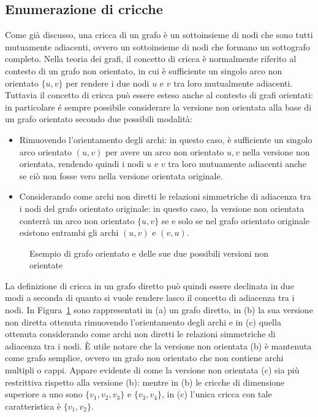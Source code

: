 \subsection{Enumerazione di cricche}\label{sec:enumerazione-di-cricche}

Come gi\`a discusso, una cricca di un grafo \`e un sottoinsieme di nodi che sono tutti mutuamente
adiacenti, ovvero un sottoinsieme di nodi che formano un sottografo completo.
Nella teoria dei grafi, il concetto di cricca \`e normalmente riferito al contesto di un grafo non orientato,
in cui \`e sufficiente un singolo arco non orientato $\{u, v\}$ per rendere i due nodi $u$ e $v$ tra loro
mutualmente adiacenti.
Tuttavia il concetto di cricca pu\`o essere esteso anche al contesto di grafi orientati: in particolare \'e sempre
possibile considerare la versione non orientata alla base di un grafo orientato secondo due possibili modalit\`a:
\begin{itemize}
    \item Rimuovendo l'orientamento degli archi: in questo caso, \`e sufficiente un singolo arco orientato $(u, v)$
        per avere un arco non orientato ${u, v}$ nella versione non orientata, rendendo quindi i nodi $u$ e $v$ tra loro
        mutuamente adiacenti anche se ci\`o non fosse vero nella versione orientata originale.
    \item Considerando come archi non diretti le relazioni simmetriche di adiacenza tra i nodi del grafo orientato
        originale: in questo caso, la versione non orientata conterr\`a un arco non orientato $\{u, v\}$ se e solo se
        nel grafo orientato originale esistono entrambi gli archi $(u, v)$ e $(v, u)$.
\end{itemize}

\begin{figure}[H]
    \centering
    
    \caption{Esempio di grafo orientato e delle sue due possibili versioni non orientate}
    \label{fig:undirected_version_example}
\end{figure}

La definizione di cricca in un grafo diretto pu\`o quindi essere declinata in due modi a seconda di quanto si vuole
rendere lasco il concetto di adiacenza tra i nodi.
In Figura~\ref{fig:undirected_version_example} sono rappresentati in (a) un grafo diretto, in (b) la sua versione non
diretta ottenuta rimuovendo l'orientamento degli archi e in (c) quella ottenuta considerando come archi non diretti le
relazioni simmetriche di adiacenza tra i nodi. \`E utile notare che la versione non orientata (b) \`e mantenuta come
grafo semplice, ovvero un grafo non orientato che non contiene archi multipli o cappi.
Appare evidente di come la versione non orientata (c) sia pi\`u restrittiva rispetto alla versione (b): mentre
in (b) le cricche di dimensione superiore a uno sono $\{v_1, v_2, v_3\}$ e $\{v_3, v_4\}$, in (c) l'unica
cricca con tale caratteristica \`e $\{v_1, v_2\}$. \newline


